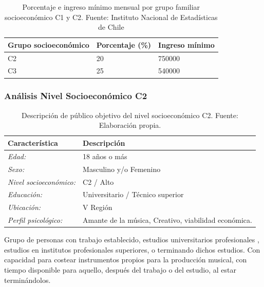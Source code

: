 \begin{table}[h!]
\centering
\begin{tabular}{|l|l|l|}
\hline
Grupo socioeconómico & Porcentaje (\%) & Ingreso mínimo\\
\hline
C2 & 20 & 750000\\
C3 & 25 & 540000\\
\hline
\end{tabular}
\caption[Porcentaje e ingreso mínimo de grupos socioeconómico C1 y
C2]{Porcentaje e ingreso mínimo mensual por grupo familiar socioeconómico C1 y
C2. Fuente: Instituto Nacional de Estadísticas de Chile}
\end{table}


\subsubsection{Análisis Nivel Socioeconómico C2}

\begin{table}[h!]
\centering
	\begin{tabular}{|l|p{5cm}|}
	\hline
	\textbf{Característica} & \textbf{Descripción}\\\hline
	\emph{Edad:} &	18 años o más\\\hline
	\emph{Sexo:} & 	Masculino y/o Femenino\\\hline
	\emph{Nivel socioeconómico: } & C2 / Alto \\\hline
	\emph{Educación:} & Universitario / Técnico superior\\\hline
	\emph{Ubicación:} & V Región\\\hline
	\emph{Perfil psicológico:} & Amante de la música, Creativo, viabilidad económica.\\\hline
	\end{tabular}
\caption[Descripción del público objetivo del nivel socioeconómico
C2]{Descripción de público objetivo del nivel socioeconómico C2. Fuente:
Elaboración propia.}
\end{table}

Grupo de personas con trabajo establecido, estudios universitarios profesionales
, estudios en institutos profesionales superiores, o terminando dichos estudios.
Con capacidad para costear instrumentos propios para la producción musical,
con tiempo disponible para aquello, después del trabajo o del estudio,
al estar terminándolos.

